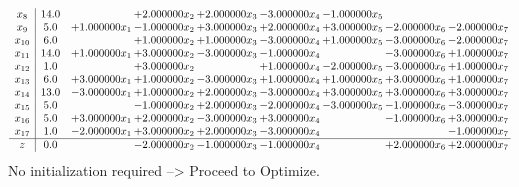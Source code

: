 \documentclass[10pt]{article}
\begin{document}
\[\begin{array}{c| c c@{\hskip 2pt} c@{\hskip 2pt} c@{\hskip 2pt} c@{\hskip 2pt} c@{\hskip 2pt} c@{\hskip 2pt} c@{\hskip 2pt} }
 x_{8}   &  14.0  &   & + 2.000000 x_{2} & + 2.000000 x_{3} & -3.000000 x_{4} & -1.000000 x_{5} &    &   \\
 x_{9}   &  5.0 & + 1.000000 x_{1} & -1.000000 x_{2} & + 3.000000 x_{3} & + 2.000000 x_{4} & + 3.000000 x_{5} & -2.000000 x_{6} & -2.000000 x_{7}\\
 x_{10}   &  6.0  &   & + 1.000000 x_{2} & + 1.000000 x_{3} & -3.000000 x_{4} & + 1.000000 x_{5} & -3.000000 x_{6} & -2.000000 x_{7}\\
 x_{11}   &  14.0 & + 1.000000 x_{1} & + 3.000000 x_{2} & -3.000000 x_{3} & -1.000000 x_{4} &   & -3.000000 x_{6} & + 1.000000 x_{7}\\
 x_{12}   &  1.0  &   & + 3.000000 x_{2} &   & + 1.000000 x_{4} & -2.000000 x_{5} & -3.000000 x_{6} & + 1.000000 x_{7}\\
 x_{13}   &  6.0 & + 3.000000 x_{1} & + 1.000000 x_{2} & -3.000000 x_{3} & + 1.000000 x_{4} & + 1.000000 x_{5} & + 3.000000 x_{6} & + 1.000000 x_{7}\\
 x_{14}   &  13.0 & -3.000000 x_{1} & + 1.000000 x_{2} & + 2.000000 x_{3} & -3.000000 x_{4} & + 3.000000 x_{5} & + 3.000000 x_{6} & + 3.000000 x_{7}\\
 x_{15}   &  5.0  &   & -1.000000 x_{2} & + 2.000000 x_{3} & -2.000000 x_{4} & -3.000000 x_{5} & -1.000000 x_{6} & -3.000000 x_{7}\\
 x_{16}   &  5.0 & + 3.000000 x_{1} & + 2.000000 x_{2} & -3.000000 x_{3} & + 3.000000 x_{4} &   & -1.000000 x_{6} & + 3.000000 x_{7}\\
 x_{17}   &  1.0 & -2.000000 x_{1} & + 3.000000 x_{2} & + 2.000000 x_{3} & -3.000000 x_{4} &    &   & -1.000000 x_{7}\\
\hline
z    &  0.0  &   & -2.000000 x_{2} & -1.000000 x_{3} & -1.000000 x_{4} &   & + 2.000000 x_{6} & + 2.000000 x_{7}\\
\end{array}\]
No initialization required --> Proceed to Optimize. 
\end{document}
